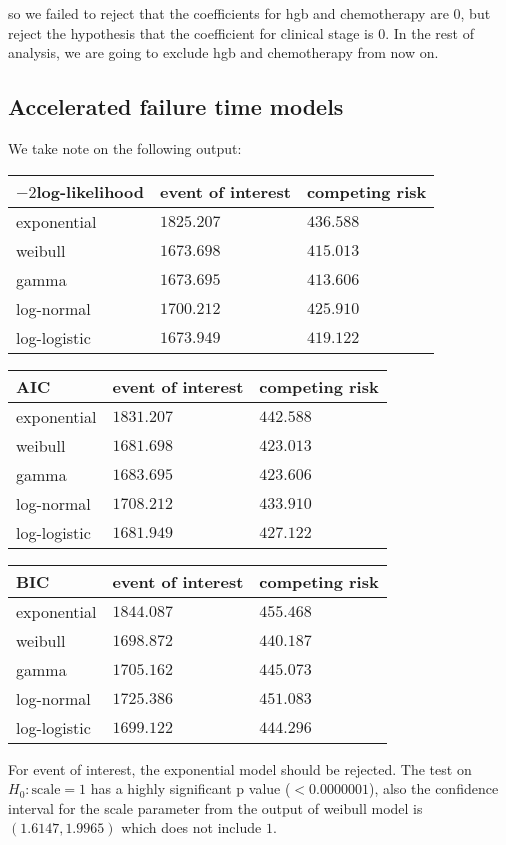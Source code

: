 \documentclass[times, doublespace]{simauth}
\begin{document}
so we failed to reject that the coefficients for hgb and chemotherapy are $0$, but reject the hypothesis that the coefficient for clinical stage is $0$. In the rest of analysis, we are going to exclude hgb and chemotherapy from now on.
\subsection{Accelerated failure time models}
We take note on the following output:
\begin{center}
\begin{tabular}{lll}
	\hline
	$-2$log-likelihood&event of interest&competing risk\\
	\hline
	exponential&$1825.207$& $436.588$\\
	weibull&$1673.698$& $415.013$\\
	gamma&$1673.695$& $413.606$\\
	log-normal& $1700.212$& $425.910$\\
	log-logistic&$1673.949$& $419.122$\\
	\hline
\end{tabular}
\begin{tabular}{lll}
	\hline
	AIC&event of interest&competing risk\\
	\hline
	exponential&$1831.207$&$442.588$\\
	weibull&$1681.698$& $423.013$\\
	gamma&$1683.695$& $423.606$\\
	log-normal&$1708.212$& $433.910$\\
	log-logistic&$1681.949$&$427.122$\\
	\hline
\end{tabular}
\end{center}
\begin{center}
\begin{tabular}{lll}
	\hline
	BIC&event of interest&competing risk\\
	\hline
	exponential&$1844.087$& $455.468$\\
	weibull&$1698.872$&$440.187$\\
	gamma&$1705.162$&$445.073$\\
	log-normal&$1725.386$&$451.083$\\
	log-logistic&$1699.122$&$444.296$\\
	\hline
\end{tabular}
\end{center}

For event of interest, the exponential model should be rejected. The test on $H_0: \text{scale} = 1$ has a highly significant p value ($<0.0000001$), also the confidence interval for the scale parameter from the output of weibull model is $(1.6147, 1.9965)$ which does not include $1$.
\end{document}
